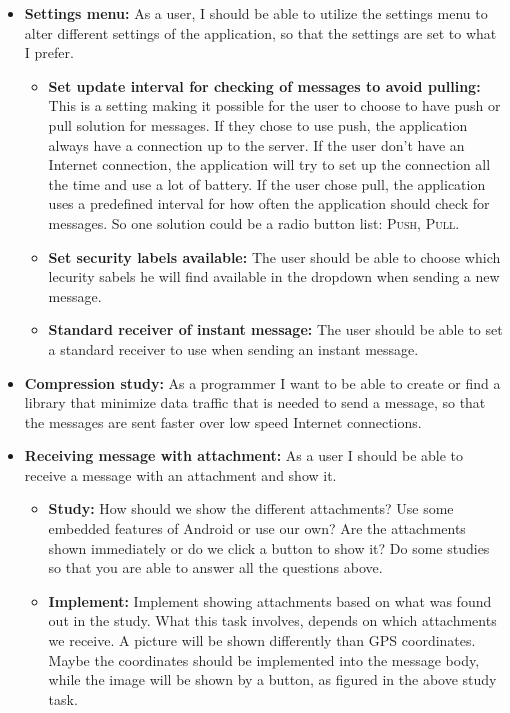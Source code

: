 \begin{itemize}
\newpage

\item{}\textbf{Settings menu:} As a user, I should be able to utilize the settings menu to alter different settings of the application, so that the settings are set to what I prefer.
\begin{itemize}
\item{}\textbf{Set update interval for checking of messages to avoid pulling:} This is a setting making it possible for the user to choose to have push or pull solution for messages. If they chose to use push, the application always have a connection up to the server. If the user don’t have an Internet connection, the application will try to set up the connection all the time and use a lot of battery. If the user chose pull, the application uses a predefined interval for how often the application should check for messages. So one solution could be a radio button list: \textsc{Push}, \textsc{Pull}.
\item{}\textbf{Set security labels available:} The user should be able to choose which lecurity sabels he will find available in the dropdown when sending a new message.
\item{}\textbf{Standard receiver of instant message:} The user should be able to set a standard receiver to use when sending an instant message.
\end{itemize}
\item{}\textbf{Compression study:} As a programmer I want to be able to create or find a library that minimize data traffic that is needed to send a message, so that the messages are sent faster over low speed Internet connections.
\item{}\textbf{Receiving message with attachment:} As a user I should be able to receive a message with an attachment and show it.
\begin{itemize}
\item{}\textbf{Study:} How should we show the different attachments? Use some embedded features of Android or use our own? Are the attachments shown immediately or do we click a button to show it? Do some studies so that you are able to answer all the questions above.
\item{}\textbf{Implement:} Implement showing attachments based on what was found out in the study. What this task involves, depends on which attachments we receive. A picture will be shown differently than GPS coordinates. Maybe the coordinates should be implemented into the message body, while the image will be shown by a button, as figured in the above study task.

\end{itemize}
\end{itemize}
